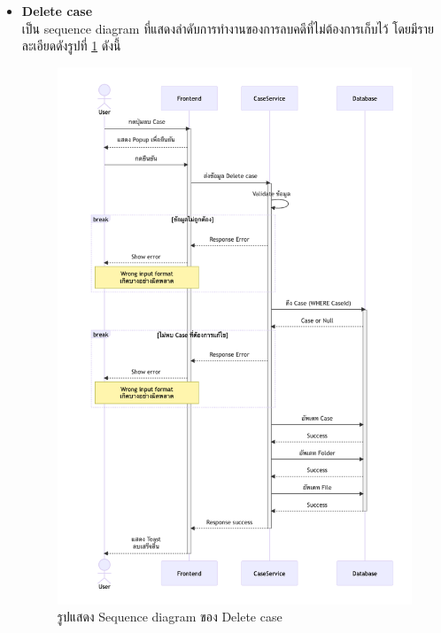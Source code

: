 \documentclass[12pt,oneside,openright,a4paper]{cpe-thai-project}
\begin{document}
\begin{itemize}
    \newpage
    \item \textbf{Delete case} \\
    เป็น sequence diagram ที่แสดงลำดับการทำงานของการลบคดีที่ไม่ต้องการเก็บไว้ โดยมีรายละเอียดดังรูปที่ \ref{fig:sqDeleteCase} ดังนี้ 
    \begin{figure}[!ht]\centering
        \includegraphics[width=14cm, trim={1.5cm 1cm 1 1cm},clip]{./assets/sequence-diagram/delete-case.png}
        \caption{รูปแสดง Sequence diagram ของ Delete case}\label{fig:sqDeleteCase}
    \end{figure}


\end{itemize}
\end{document}
